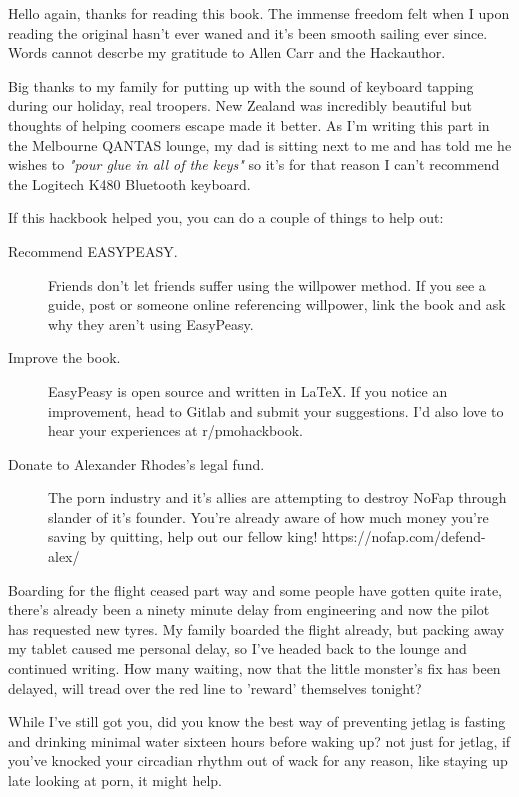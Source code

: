 \documentclass[easypeasy.tex]{subfiles}
\begin{document}
Hello again, thanks for reading this book. The immense freedom felt when I upon reading the original hasn't ever waned and it's been smooth sailing ever since. Words cannot descrbe my gratitude to Allen Carr and the Hackauthor. 

Big thanks to my family for putting up with the sound of keyboard tapping during our holiday, real troopers. New Zealand was incredibly beautiful but thoughts of helping coomers escape made it better. As I'm writing this part in the Melbourne QANTAS lounge, my dad is sitting next to me and has told me he wishes to \textit{"pour glue in all of the keys"} so it's for that reason I can't recommend the Logitech K480 Bluetooth keyboard.

If this hackbook helped you, you can do a couple of things to help out:
  \begin{description}
  \item [Recommend EASYPEASY.] Friends don't let friends suffer using the willpower method. If you see a guide, post or someone online referencing willpower, link the book and ask why they aren't using EasyPeasy.

  \item [Improve the book.] EasyPeasy is open source and written in LaTeX. If you notice an improvement, head to Gitlab and submit your suggestions. I'd also love to hear your experiences at r/pmohackbook.

  \item [Donate to Alexander Rhodes's legal fund.] The porn industry and it's allies are attempting to destroy NoFap through slander of it's founder. You're already aware of how much money you're saving by quitting, help out our fellow king! https://nofap.com/defend-alex/
  \end{description}

Boarding for the flight ceased part way and some people have gotten quite irate, there's already been a ninety minute delay from engineering and now the pilot has requested new tyres. My family boarded the flight already, but packing away my tablet caused me personal delay, so I've headed back to the lounge and continued writing. How many waiting, now that the little monster's fix has been delayed, will tread over the red line to 'reward' themselves tonight?

While I've still got you, did you know the best way of preventing jetlag is fasting and drinking minimal water sixteen hours before waking up? not just for jetlag, if you've knocked your circadian rhythm out of wack for any reason, like staying up late looking at porn, it might help.
\end{document}
